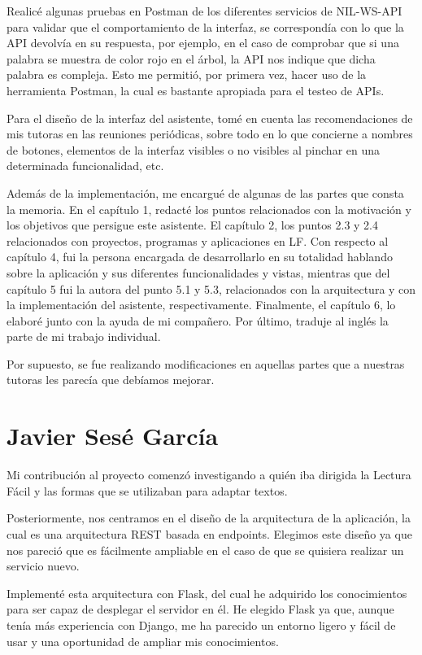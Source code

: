 Realicé algunas pruebas en Postman de los diferentes servicios de NIL-WS-API para validar que el comportamiento de la interfaz, se correspondía con lo que la API devolvía en su respuesta, por ejemplo, en el caso de comprobar que si una palabra se muestra de color rojo en el árbol, la API nos indique que dicha palabra es compleja. Esto me permitió, por primera vez, hacer uso de la herramienta Postman, la cual es bastante apropiada para el testeo de APIs.

Para el diseño de la interfaz del asistente, tomé en cuenta las recomendaciones de mis tutoras en las reuniones periódicas, sobre todo en lo que concierne a nombres de botones, elementos de la interfaz visibles o no visibles al pinchar en una determinada funcionalidad, etc.



Además de la implementación, me encargué de algunas de las partes que consta la memoria. En el capítulo 1, redacté los puntos relacionados con la motivación y los objetivos que persigue este asistente. El capítulo 2, los puntos 2.3 y 2.4 relacionados con proyectos, programas y aplicaciones en LF. Con respecto al capítulo 4, fui la persona encargada de desarrollarlo en su totalidad hablando sobre la aplicación y sus diferentes funcionalidades y vistas, mientras que del capítulo 5 fui la autora del punto 5.1 y 5.3, relacionados con la arquitectura y con la implementación del asistente, respectivamente. Finalmente, el capítulo 6, lo elaboré junto con la ayuda de mi compañero. Por último, traduje al inglés la parte de mi trabajo individual.



Por supuesto, se fue realizando modificaciones en aquellas partes que a nuestras tutoras les parecía que debíamos mejorar.

\section{Javier Sesé García}

Mi contribución al proyecto comenzó investigando a quién iba dirigida la Lectura Fácil y las formas que se utilizaban para adaptar textos. 

Posteriormente, nos centramos en el diseño de la arquitectura de la aplicación, la cual es una arquitectura REST basada en endpoints. Elegimos este diseño ya que nos pareció que es fácilmente ampliable en el caso de que se quisiera realizar un servicio nuevo.

Implementé esta arquitectura con Flask, del cual he adquirido los conocimientos para ser capaz de desplegar el servidor en él. He elegido Flask ya que, aunque tenía más experiencia con Django, me ha parecido un entorno ligero y fácil de usar y una oportunidad de ampliar mis conocimientos.

